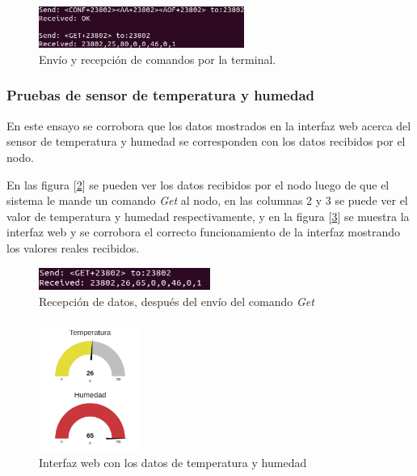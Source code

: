 \begin{figure}[ht!]
	\centering
	\includegraphics[width=0.6\textwidth]{./Figures/interfaz82.png}
	\caption{Envío y recepción de comandos por la terminal.}
	\label{fig:interfaz82}
\end{figure}


\subsubsection{Pruebas de sensor de temperatura y humedad}

En este ensayo se corrobora que los datos mostrados en la interfaz web acerca del sensor de temperatura y humedad se corresponden con los datos recibidos por el nodo.

En las figura [\ref{fig:interfaz90}] se pueden ver los datos recibidos por el nodo luego de que el sistema le mande un comando {\textit{Get}} al nodo, en las columnas 2 y 3 se puede ver el valor de temperatura y humedad respectivamente, y en la figura [\ref{fig:interfaz91}] se muestra la interfaz web y se corrobora el correcto funcionamiento de la interfaz mostrando los valores reales recibidos.

\begin{figure}[ht!]
	\centering
	\includegraphics[width=0.5\textwidth]{./Figures/interfaz90.png}
	\caption{Recepción de datos, después del envío del comando {\textit{Get}} }
	\label{fig:interfaz90}
\end{figure}

\begin{figure}[ht!]
	\centering
	\includegraphics[width=0.3\textwidth]{./Figures/interfaz91.png}
	\caption{Interfaz web con los datos de temperatura y humedad}
	\label{fig:interfaz91}
\end{figure}

